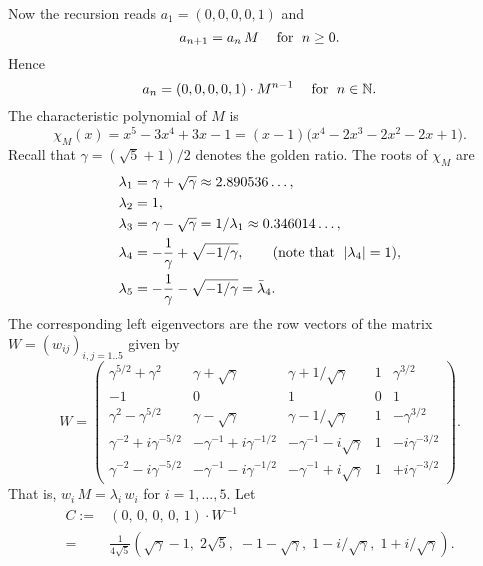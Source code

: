 \documentclass[11pt]{article}
\providecommand{\1}{\mathBB{1}}
\newcommand{\mbsr}[1]{\mbox{#1\; }}
\newcommand{\mf}{\quad\mbox{\;for \;}}
\newcommand{\N}{{\mathbb{N}}}
\begin{document}
Now the recursion reads
$a_1=(0,0,0,0,1)$ and
\begin{equation}
\label{E4.02}
a_{n+1}=a_n\,M\mf n\geq0.
\end{equation}
Hence
\begin{equation}
\label{E4.03}
a_n=(0,0,0,0,1)\cdot M^{n-1}\mf n\in\N.
\end{equation}
 The characteristic polynomial of $M$ is
\begin{equation}
\label{E4.04}
\chi_M(x)=x^5-3x^4+3x-1=(x-1)\big(x^4-2x^3-2x^2-2x+1\big).
\end{equation}
Recall that $\gamma=(\sqrt{5}+1)/2$
denotes the golden ratio. The roots of $\chi_M$ are
\begin{equation}
\label{E4.05}
\begin{aligned}
\lambda_1&=\gamma+\sqrt{\gamma}\approx 2.890536\ldots,\\
\lambda_2&=1,\\
\lambda_3&=\gamma-\sqrt{\gamma}=1/\lambda_1\approx 0.346014\ldots,\\
\lambda_4&=-\frac1\gamma+\sqrt{-1/\gamma},\qquad (\mbsr{note that} |\lambda_4|=1),\\
\lambda_5&=-\frac1\gamma-\sqrt{-1/\gamma}=\bar\lambda_4.
\end{aligned}
\end{equation}
The corresponding left eigenvectors are the row vectors of the matrix $W=(w_{ij})_{i,j=1..5}$ given by
\begin{equation}
\label{E4.06}
W=\left(\begin{array}{ccccc}

\gamma^{5/2}+\gamma^2&\gamma+\sqrt{\gamma}&\gamma+1/\sqrt{\gamma}
&1&\gamma^{3/2}\\[1mm]
-1&0&1&0&1\\[1mm]
\gamma^2-\gamma^{5/2}&\gamma-\sqrt{\gamma}&\gamma-1/\sqrt{\gamma}
&1&-\gamma^{3/2}\\[1mm]
\gamma^{-2}+i\gamma^{-5/2}&-\gamma^{-1}+i\gamma^{-1/2}
&-\gamma^{-1}-i\sqrt{\gamma}&1&-i\gamma^{-3/2}\\[1mm]
\gamma^{-2}-i\gamma^{-5/2}&-\gamma^{-1}-i\gamma^{-1/2}
&-\gamma^{-1}+i\sqrt{\gamma}&1&+i\gamma^{-3/2}
\end{array}\right).
\end{equation}
That is, $w_i\,M=\lambda_i\,w_i$ for $i=1,\ldots,5$.
Let
\begin{equation}\label{E4.07}
\begin{aligned}
C:=&(0,\,0,\,0,\,0,\,1)\cdot W^{-1}\\
=&\frac{1}{4\sqrt{5}}\left(\sqrt{\gamma}-1,\;2\sqrt{5},\;-1-\sqrt{\gamma},
\;1-i/\sqrt{\gamma},\;1+i/\sqrt{\gamma}\right).
\end{aligned}
\end{equation}
\end{document}
